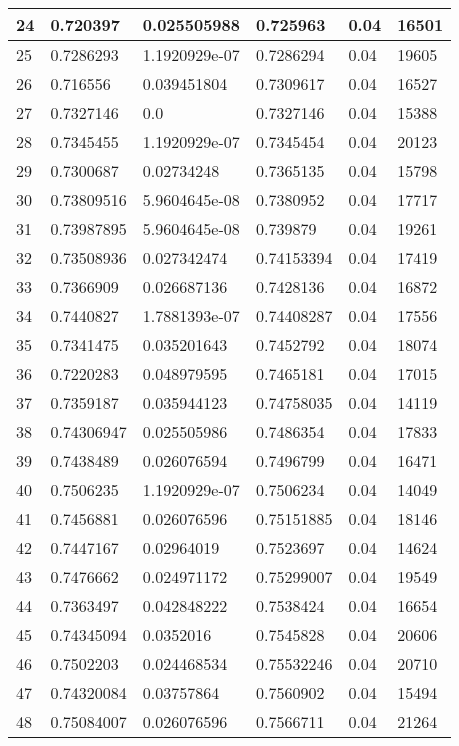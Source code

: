 \begin{longtable}{|l|l|l|l|l|l|}
24 & 0.720397 & 0.025505988 & 0.725963 & 0.04 & 16501 \\ \hline 
25 & 0.7286293 & 1.1920929e-07 & 0.7286294 & 0.04 & 19605 \\ \hline 
26 & 0.716556 & 0.039451804 & 0.7309617 & 0.04 & 16527 \\ \hline 
27 & 0.7327146 & 0.0 & 0.7327146 & 0.04 & 15388 \\ \hline 
28 & 0.7345455 & 1.1920929e-07 & 0.7345454 & 0.04 & 20123 \\ \hline 
29 & 0.7300687 & 0.02734248 & 0.7365135 & 0.04 & 15798 \\ \hline 
30 & 0.73809516 & 5.9604645e-08 & 0.7380952 & 0.04 & 17717 \\ \hline 
31 & 0.73987895 & 5.9604645e-08 & 0.739879 & 0.04 & 19261 \\ \hline 
32 & 0.73508936 & 0.027342474 & 0.74153394 & 0.04 & 17419 \\ \hline 
33 & 0.7366909 & 0.026687136 & 0.7428136 & 0.04 & 16872 \\ \hline 
34 & 0.7440827 & 1.7881393e-07 & 0.74408287 & 0.04 & 17556 \\ \hline 
35 & 0.7341475 & 0.035201643 & 0.7452792 & 0.04 & 18074 \\ \hline 
36 & 0.7220283 & 0.048979595 & 0.7465181 & 0.04 & 17015 \\ \hline 
37 & 0.7359187 & 0.035944123 & 0.74758035 & 0.04 & 14119 \\ \hline 
38 & 0.74306947 & 0.025505986 & 0.7486354 & 0.04 & 17833 \\ \hline 
39 & 0.7438489 & 0.026076594 & 0.7496799 & 0.04 & 16471 \\ \hline 
40 & 0.7506235 & 1.1920929e-07 & 0.7506234 & 0.04 & 14049 \\ \hline 
41 & 0.7456881 & 0.026076596 & 0.75151885 & 0.04 & 18146 \\ \hline 
42 & 0.7447167 & 0.02964019 & 0.7523697 & 0.04 & 14624 \\ \hline 
43 & 0.7476662 & 0.024971172 & 0.75299007 & 0.04 & 19549 \\ \hline 
44 & 0.7363497 & 0.042848222 & 0.7538424 & 0.04 & 16654 \\ \hline 
45 & 0.74345094 & 0.0352016 & 0.7545828 & 0.04 & 20606 \\ \hline 
46 & 0.7502203 & 0.024468534 & 0.75532246 & 0.04 & 20710 \\ \hline 
47 & 0.74320084 & 0.03757864 & 0.7560902 & 0.04 & 15494 \\ \hline 
48 & 0.75084007 & 0.026076596 & 0.7566711 & 0.04 & 21264 \\ \hline 

\end{longtable}

